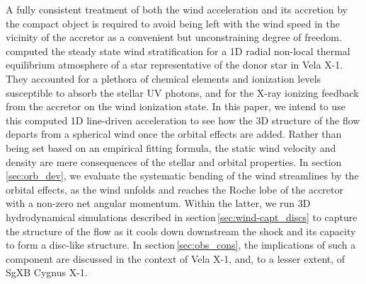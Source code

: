 \documentclass{aa}
\newcommand{\sgx}{SgXB\xspace}
\begin{document}
A fully consistent treatment of both the wind acceleration and its accretion by the compact object is required to avoid being left with the wind speed in the vicinity of the accretor as a convenient but unconstraining degree of freedom. \cite{Sander2017} computed the steady state wind stratification for a 1D radial non-local thermal equilibrium atmosphere of a star representative of the donor star in Vela X-1. They accounted for a plethora of chemical elements and ionization levels susceptible to absorb the stellar UV photons, and for the X-ray ionizing feedback from the accretor on the wind ionization state. In this paper, we intend to use this computed 1D line-driven acceleration to see how the 3D structure of the flow departs from a spherical wind once the orbital effects are added. Rather than being set based on an empirical fitting formula, the static wind velocity and density are mere consequences of the stellar and orbital properties. In section\,\ref{sec:orb_dev}, we evaluate the systematic bending of the wind streamlines by the orbital effects, as the wind unfolds and reaches the Roche lobe of the accretor with a non-zero net angular momentum. Within the latter, we run 3D hydrodynamical simulations described in section\,\ref{sec:wind-capt_discs} to capture the structure of the flow as it cools down downstream the shock and its capacity to form a disc-like structure. In section\,\ref{sec:obs_cons}, the implications of such a component are discussed in the context of Vela X-1, and, to a lesser extent, of \sgx Cygnus X-1. 
\end{document}
